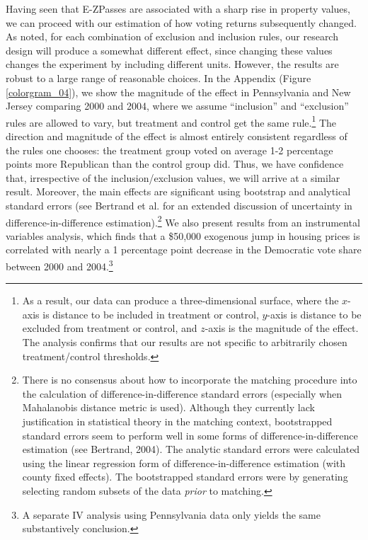 \documentclass[11.0pt]{article}
\theoremstyle{definition}
\begin{document}
Having seen that E-ZPasses are associated with a sharp rise in property values, we can proceed with our estimation of how voting returns subsequently changed. As noted, for each combination of exclusion and inclusion rules, our research design will produce a somewhat different effect, since changing these values changes the experiment by including different units. However, the results are robust to a large range of reasonable choices. In the Appendix (Figure \ref{colorgram_04}), we show 
the magnitude of the effect in Pennsylvania and New Jersey comparing 2000 and 2004, where we assume ``inclusion'' and ``exclusion'' rules are allowed to vary, but treatment and control get the same rule.\footnote{As a result, our data can produce a three-dimensional surface, where the $x$-axis is distance to be included in treatment or control, $y$-axis is distance to be excluded from treatment or control, and $z$-axis is the magnitude of the effect. The analysis confirms that our results are not specific to arbitrarily chosen treatment/control thresholds. } The direction and magnitude of the effect is almost entirely consistent regardless of the rules one chooses: the treatment group voted on average 1-2 percentage points more Republican than the control group did. Thus, we have confidence that, irrespective of the inclusion/exclusion values, we will arrive at a similar result. Moreover, the main effects are significant using bootstrap and analytical standard errors (see Bertrand et al. for an extended discussion of uncertainty in difference-in-difference estimation).\footnote{There is no consensus about how to incorporate the matching procedure into the calculation of difference-in-difference standard errors (especially when Mahalanobis distance metric is used). Although they currently lack justification in statistical theory in the matching context, bootstrapped standard errors seem to perform well in some forms of difference-in-difference estimation (see Bertrand, 2004). The analytic standard errors were calculated using the linear regression form of difference-in-difference estimation (with county fixed effects). The bootstrapped standard errors were by generating selecting random subsets of the data \emph{prior} to matching.} We also present results from an instrumental variables analysis, which finds that a \$50,000 exogenous jump in housing prices is correlated with nearly a 1 percentage point decrease in the Democratic vote share between 2000 and 2004.\footnote{A separate IV analysis using Pennsylvania data only yields the same substantively conclusion.}
\end{document}
